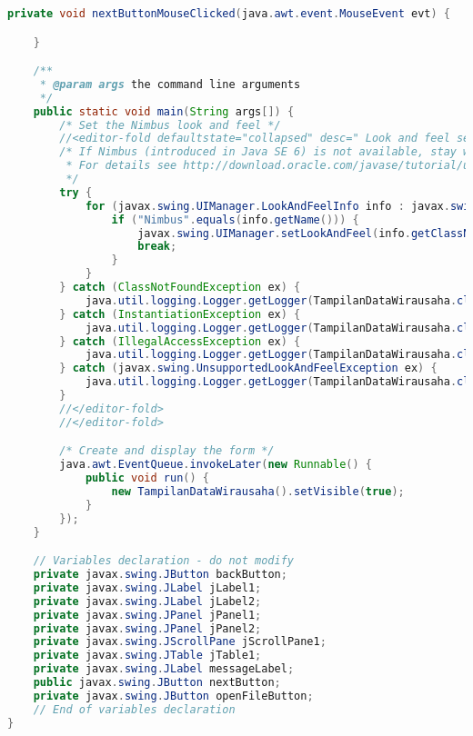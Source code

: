 \begin{lstlisting}[language=Java, caption=TampilanDataWirausaha.java]
    private void nextButtonMouseClicked(java.awt.event.MouseEvent evt) {                                        

    }                                       

    /**
     * @param args the command line arguments
     */
    public static void main(String args[]) {
        /* Set the Nimbus look and feel */
        //<editor-fold defaultstate="collapsed" desc=" Look and feel setting code (optional) ">
        /* If Nimbus (introduced in Java SE 6) is not available, stay with the default look and feel.
         * For details see http://download.oracle.com/javase/tutorial/uiswing/lookandfeel/plaf.html 
         */
        try {
            for (javax.swing.UIManager.LookAndFeelInfo info : javax.swing.UIManager.getInstalledLookAndFeels()) {
                if ("Nimbus".equals(info.getName())) {
                    javax.swing.UIManager.setLookAndFeel(info.getClassName());
                    break;
                }
            }
        } catch (ClassNotFoundException ex) {
            java.util.logging.Logger.getLogger(TampilanDataWirausaha.class.getName()).log(java.util.logging.Level.SEVERE, null, ex);
        } catch (InstantiationException ex) {
            java.util.logging.Logger.getLogger(TampilanDataWirausaha.class.getName()).log(java.util.logging.Level.SEVERE, null, ex);
        } catch (IllegalAccessException ex) {
            java.util.logging.Logger.getLogger(TampilanDataWirausaha.class.getName()).log(java.util.logging.Level.SEVERE, null, ex);
        } catch (javax.swing.UnsupportedLookAndFeelException ex) {
            java.util.logging.Logger.getLogger(TampilanDataWirausaha.class.getName()).log(java.util.logging.Level.SEVERE, null, ex);
        }
        //</editor-fold>
        //</editor-fold>

        /* Create and display the form */
        java.awt.EventQueue.invokeLater(new Runnable() {
            public void run() {
                new TampilanDataWirausaha().setVisible(true);
            }
        });
    }

    // Variables declaration - do not modify                     
    private javax.swing.JButton backButton;
    private javax.swing.JLabel jLabel1;
    private javax.swing.JLabel jLabel2;
    private javax.swing.JPanel jPanel1;
    private javax.swing.JPanel jPanel2;
    private javax.swing.JScrollPane jScrollPane1;
    private javax.swing.JTable jTable1;
    private javax.swing.JLabel messageLabel;
    public javax.swing.JButton nextButton;
    private javax.swing.JButton openFileButton;
    // End of variables declaration                   
}

\end{lstlisting}

